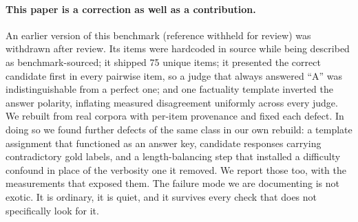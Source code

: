 \paragraph{This paper is a correction as well as a contribution.}
An earlier version of this benchmark
\ifblind(reference withheld for review)\else\citep{bellibatlu2026judgesense}\fi{} was
withdrawn after review. Its items were
hardcoded in source while being described as benchmark-sourced; it shipped 75
unique items; it presented the correct candidate first in every pairwise item, so
a judge that always answered ``A'' was indistinguishable from a perfect one; and
one factuality template inverted the answer polarity, inflating measured
disagreement uniformly across every judge. We rebuilt from real corpora with
per-item provenance and fixed each defect. In doing so we found further defects of the same class in our own rebuild: a
template assignment that functioned as an answer key, candidate responses
carrying contradictory gold labels, and a length-balancing step that installed a
difficulty confound in place of the verbosity one it removed. We report those
too, with the measurements that exposed them. The failure mode we are documenting is not exotic. It is
ordinary, it is quiet, and it survives every check that does not specifically
look for it.


